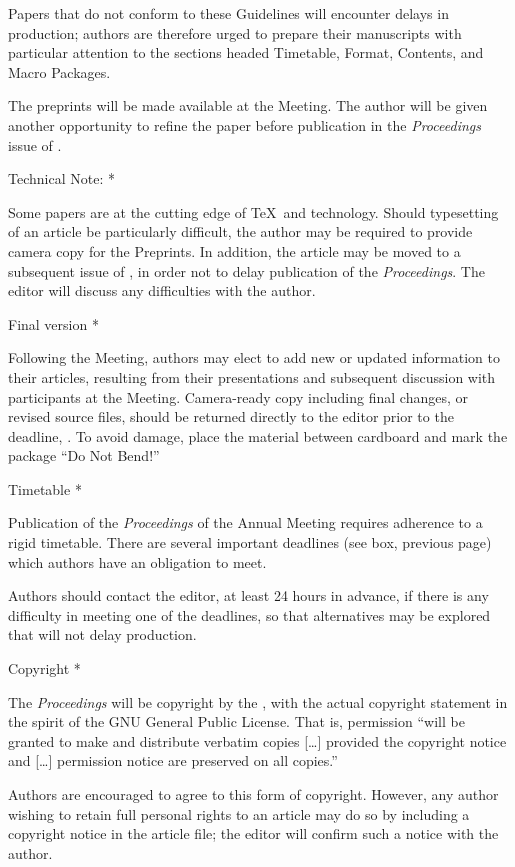 Papers that do not conform to these Guidelines will encounter delays in
production; authors are therefore urged to prepare their manuscripts
with particular attention to the sections headed Timetable, Format,
Contents, and Macro Packages.
 
The preprints will be made available at the Meeting. The author will be
given another opportunity to refine the paper before publication in the
{\sl Proceedings\/} issue of \TUB.
 
\subsubhead *Technical Note: *
 
Some papers are at the cutting edge of \TeX\ and technology.  Should
typesetting of an article be particularly difficult, the author may be
required to provide camera copy for the Preprints.  In addition, the
article may be moved to a subsequent issue of \TUB, in order not to
delay publication of the {\sl Proceedings}.  The editor will discuss
any difficulties with the author.
 
\subhead * Final version *
 
Following the Meeting, authors may elect to add new or updated
information to their articles, resulting from their presentations and
subsequent discussion with participants at the Meeting.  Camera-ready
copy including final changes, or revised source files, should be
returned directly to the editor prior to the deadline, {\bf
\CameraDeadline}.  To avoid damage, place the material between cardboard
and mark the package ``Do Not Bend!''
 
\head * Timetable *
 
Publication of the {\sl Proceedings\/} of the Annual Meeting requires
adherence to a rigid timetable.  There are several important deadlines
(see box, previous page) which authors have an obligation to meet.
 
Authors should contact the editor, at least 24 hours in advance, if
there is any difficulty in meeting one of the deadlines, so that
alternatives may be explored that will not delay production.
 
\head * Copyright *
 
The {\sl Proceedings\/} will be copyright by the \TUG, with the
actual copyright statement in the spirit of the GNU General
Public License.  That is, permission ``will be granted to make and
distribute verbatim copies [\dots] provided the copyright notice and
[\dots] permission notice are preserved on all copies.''

Authors are encouraged to agree to this form of copyright.
However, any author wishing to retain full personal rights to an
article may do so by including a copyright notice in the article file;
the editor will confirm such a notice with the author.
 
